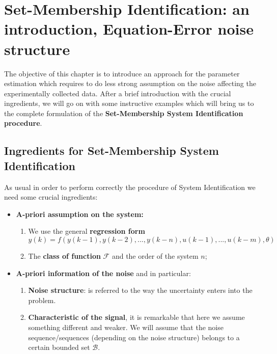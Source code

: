 \chapter[Set-Membership Identification: intro, Equation-Error]{Set-Membership Identification: an introduction, Equation-Error noise structure}

The objective of this chapter is to introduce an approach for the parameter estimation which requires to do less strong assumption on the noise affecting the experimentally collected data. After a brief introduction with the crucial ingredients, we will go on with some instructive examples which will bring us to the complete formulation of the \textbf{Set-Membership System Identification procedure}.

\section{Ingredients for Set-Membership System Identification}
As usual in order to perform correctly the procedure of System Identification we need some crucial ingredients:
\begin{itemize}
    \itemsep-0.2em
    \item[\ding{182}] \textbf{\textsf{A-priori assumption on the system:}}
    \begin{enumerate}
        \item[\ding{51}] We use the general \textbf{regression form} 
        \begin{equation} 
            y(k)=f(y(k-1), y(k-2),  ..., y(k-n), u(k-1), ..., u(k-m), \theta)
        \end{equation}
        \item[\ding{51}] The \textbf{class of function} $\mathcal{F}$ and the order of the system $n$;     
    \end{enumerate}
   
    \item[\ding{184}] \textbf{\textsf{A-priori information of the noise}} and in particular:
    \begin{enumerate}  
        \itemsep-0.2em
        \item[\ding{51}] \textbf{Noise structure}: is referred to the way the uncertainty enters  into the problem.
        \item[\ding{51}] \textbf{Characteristic of the signal}, it is remarkable that here we assume something different and weaker. We will assume that the noise sequence/sequences (depending on the noise structure) belongs to a certain bounded set $\mathcal{B}$.
    \end{enumerate}
\end{itemize}

